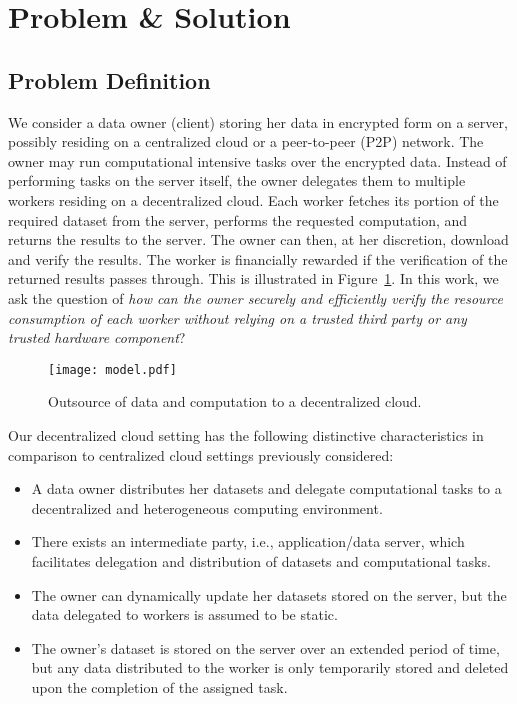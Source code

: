 \section{Problem \& Solution} \label{sect:overview}

\subsection{Problem Definition} \label{sect:problem}

We consider a data owner (client) storing her data in encrypted form on a server, possibly residing on a centralized cloud or a peer-to-peer (P2P) network.
The owner may run computational intensive tasks over the encrypted data.
Instead of performing tasks on the server itself, the owner delegates them to multiple workers residing on a decentralized cloud. 
Each worker fetches its portion of the required dataset from the server, performs the requested computation, and returns the results to the server.
The owner can then, at her discretion, download and verify the results.
The worker is financially rewarded if the verification of the returned results passes through.
This is illustrated in Figure~\ref{fig:model}.
In this work, we ask the question of {\em how can the owner securely and efficiently verify the resource consumption of each worker without relying on a trusted third party or any trusted hardware component}?

\begin{figure}[h!]\centering
  \texttt{[image: model.pdf]}
  \caption{Outsource of data and computation to a decentralized cloud.}
  \label{fig:model}
\end{figure}

Our decentralized cloud setting has the following distinctive characteristics in comparison to centralized cloud settings previously considered:
\begin{itemize}
 \item A data owner distributes her datasets and delegate computational tasks to a decentralized and heterogeneous computing environment.
 \item There exists an intermediate party, i.e., application/data server, which facilitates delegation and distribution of datasets and computational tasks.
 \item The owner can dynamically update her datasets stored on the server, but the data delegated to workers is assumed to be static.
 \item The owner's dataset is stored on the server over an extended period of time, but any data distributed to the worker is only temporarily stored and deleted upon the completion of the assigned task.
\end{itemize}

